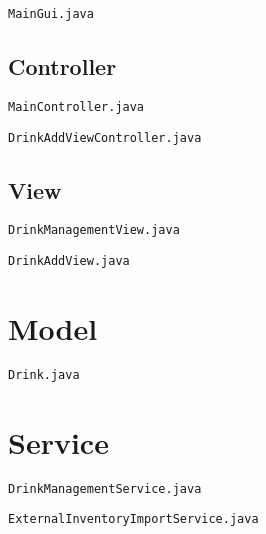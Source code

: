 \verb|MainGui.java|



\subsection{Controller}

\verb|MainController.java|



\verb|DrinkAddViewController.java|



\subsection{View}

\verb|DrinkManagementView.java|



\verb|DrinkAddView.java|



\section{Model}

\verb|Drink.java|



\section{Service}

\verb|DrinkManagementService.java|



\verb|ExternalInventoryImportService.java|



